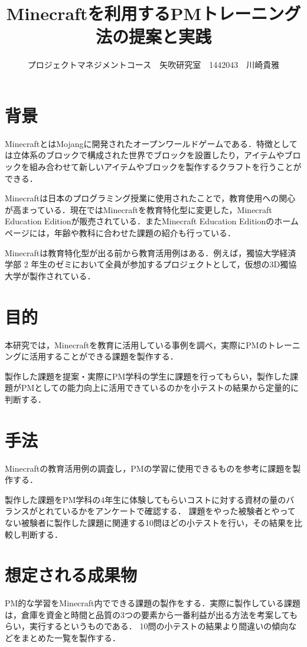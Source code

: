 \documentclass[uplatex,twocolumn,dvipdfmx]{jsarticle}
\title{\vspace{-5mm}\fontsize{14pt}{0pt}\selectfont Minecraftを利用するPMトレーニング法の提案と実践}
\author{\normalsize プロジェクトマネジメントコース　矢吹研究室　1442043　川崎貴雅}
\date{}
\begin{document}
\fontsize{10.5pt}{\baselineskip}\selectfont
\maketitle





\section{背景}

MinecraftとはMojangに開発されたオープンワールドゲームである．特徴としては立体系のブロックで構成された世界でブロックを設置したり，アイテムやブロックを組み合わせて新しいアイテムやブロックを製作するクラフトを行うことができる．


Minecraftは日本のプログラミング授業に使用されたことで，教育使用への関心が高まっている．現在ではMinecraftを教育特化型に変更した，Minecraft Education Editionが販売されている．またMinecraft Education Editionのホームページには，年齢や教科に合わせた課題の紹介も行っている\cite{self}．


Minecraftは教育特化型が出る前から教育活用例はある．例えば，獨協大学経済学部 2 年生のゼミにおいて全員が参加するプロジェクトとして，仮想の3D獨協大学が製作されている\cite{ 110009684401}．




\section{目的}
本研究では，Minecraftを教育に活用している事例を調べ，実際にPMのトレーニングに活用することができる課題を製作する．


製作した課題を提案・実際にPM学科の学生に課題を行ってもらい，製作した課題がPMとしての能力向上に活用できているのかを小テストの結果から定量的に判断する．

\section{手法}
Minecraftの教育活用例の調査し，PMの学習に使用できるものを参考に課題を製作する．

製作した課題をPM学科の4年生に体験してもらいコストに対する資材の量のバランスがとれているかをアンケートで確認する．
課題をやった被験者とやってない被験者に製作した課題に関連する10問ほどの小テストを行い，その結果を比較し判断する．

\section{想定される成果物}
PM的な学習をMinecraft内でできる課題の製作をする．実際に製作している課題は，倉庫を資金と時間と品質の3つの要素から一番利益が出る方法を考案してもらい，実行するというものである．
10問の小テストの結果より間違いの傾向などをまとめた一覧を製作する．
\end{document}
